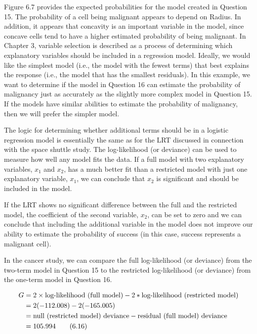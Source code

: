 \documentclass[
]{book}
\begin{document}
Figure 6.7 provides the expected probabilities for the model created in Question 15. The probability of a cell being malignant appears to depend on Radius. In addition, it appears that concavity is an important variable in the model, since concave cells tend to have a higher estimated probability of being malignant. In Chapter 3, variable selection is described as a process of determining which explanatory variables should be included in a regression model. Ideally, we would like the simplest model (i.e., the model with the fewest terms) that best explains the response (i.e., the model that has the smallest residuals). In this example, we want to determine if the model in Question 16 can estimate the probability of malignancy just as accurately as the slightly more complex model in Question 15. If the models have similar abilities to estimate the probability of malignancy, then we will prefer the simpler model.

The logic for determining whether additional terms should be in a logistic regression model is essentially the same as for the LRT discussed in connection with the space shuttle study. The log-likelihood (or deviance) can be used to measure how well any model fits the data. If a full model with two explanatory variables, \(x_1\) and \(x_2\), has a much better fit than a restricted model with just one explanatory variable, \(x_1\), we can conclude that \(x_2\) is significant and should be included in the model.

If the LRT shows no significant difference between the full and the restricted model, the coefficient of
the second variable, \(x_2\), can be set to zero and we can conclude that including the additional variable in the
model does not improve our ability to estimate the probability of success (in this case, success represents a
malignant cell).

In the cancer study, we can compare the full log-likelihood (or deviance) from the two-term model in
Question 15 to the restricted log-likelihood (or deviance) from the one-term model in Question 16.

\begin{align}
G &= 2 \times \text{log-likelihood (full model)} - 2 * \text{log-likelihood (restricted model)} \notag \\
&= 2(-112.008) - 2(-165.005) \notag \\
&= \text{null (restricted model) deviance} - \text{residual (full model) deviance} \notag \\
&= 105.994 \tag{6.16}
\end{align}
\end{document}
